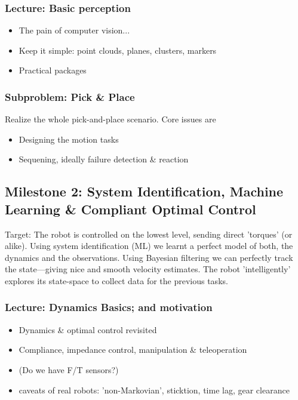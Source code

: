 \documentclass[10pt,fleqn,twoside]{article}
\begin{document}
\subsubsection{Lecture: Basic perception}
\begin{itemize}
\item The pain of computer vision...
\item Keep it simple: point clouds, planes, clusters, markers
\item Practical packages
\end{itemize}

\subsubsection{Subproblem: Pick \& Place}

Realize the whole pick-and-place scenario. Core issues are
\begin{itemize}
\item Designing the motion tasks
\item Sequening, ideally failure detection \& reaction
\end{itemize}




\subsection{Milestone 2: System Identification, Machine Learning \&
  Compliant Optimal Control}

Target: The robot is controlled on the lowest level, sending direct
'torques' (or alike). Using system identification (ML) we learnt a
perfect model of both, the dynamics and the observations. Using
Bayesian filtering we can perfectly track the state---giving nice and
smooth velocity estimates. The robot 'intelligently' explores its
state-space to collect data for the previous tasks.

\subsubsection{Lecture: Dynamics Basics; and motivation}

\begin{itemize}
\item Dynamics \& optimal control revisited
\item Compliance, impedance control, manipulation \& teleoperation
\item (Do we have F/T sensors?)
\item caveats of real robots: 'non-Markovian', sticktion, time lag,
  gear clearance
\end{itemize}
\end{document}
